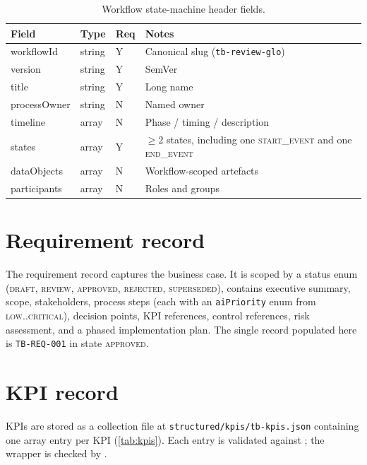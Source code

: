 \begin{table}[htbp]
\caption{Workflow state-machine header fields.}\label{tab:workflow-fields}
\centering
\small
\begin{tabularx}{\linewidth}{@{}lllX@{}}
\toprule
\textbf{Field} & \textbf{Type} & \textbf{Req} & \textbf{Notes} \\ \midrule
workflowId    & string & Y & Canonical slug (\texttt{tb-review-glo}) \\
version       & string & Y & SemVer \\
title         & string & Y & Long name \\
processOwner  & string & N & Named owner \\
timeline      & array  & N & Phase / timing / description \\
states        & array  & Y & $\ge 2$ states, including one \textsc{start\_event} and one \textsc{end\_event} \\
dataObjects   & array  & N & Workflow-scoped artefacts \\
participants  & array  & N & Roles and groups \\
\bottomrule
\end{tabularx}
\end{table}

\section{Requirement record}\label{sec:requirement-schema}

The requirement record captures the business case. It is scoped by a
status enum (\textsc{draft}, \textsc{review}, \textsc{approved},
\textsc{rejected}, \textsc{superseded}), contains executive summary,
scope, stakeholders, process steps (each with an \texttt{aiPriority}
enum from \textsc{low}..\textsc{critical}), decision points, KPI
references, control references, risk assessment, and a phased
implementation plan. The single record populated here is
\texttt{TB-REQ-001} in state \textsc{approved}.

\section{KPI record}\label{sec:kpi-schema}

KPIs are stored as a collection file at
\corpus\texttt{structured/kpis/tb-kpis.json} containing one array
entry per KPI (\cref{tab:kpis}). Each entry is validated against
; the wrapper is checked by
.

